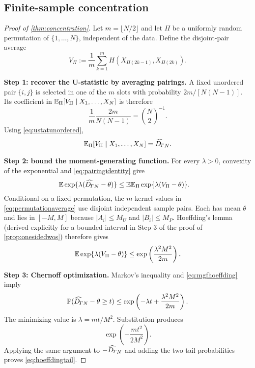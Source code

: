 \subsection{Finite-sample concentration}

\begin{proof}[Proof of \cref{thm:concentration}]
Let $m=\lfloor N/2\rfloor$ and let $\Pi$ be a uniformly random permutation of
$\{1,\ldots,N\}$, independent of the data.  Define the disjoint-pair average
\begin{equation}
 V_\Pi:=\frac1m\sum_{k=1}^m
 H(X_{\Pi(2k-1)},X_{\Pi(2k)}).
 \label{eq:permutationaverage}
\end{equation}

\textbf{Step 1: recover the U-statistic by averaging pairings.}
A fixed unordered pair $\{i,j\}$ is selected in one of the $m$ slots with
probability $2m/[N(N-1)]$.  Its coefficient in
$\mathbb{E}_\Pi[V_\Pi\mid X_1,\ldots,X_N]$ is therefore
\begin{equation}
 \frac1m\frac{2m}{N(N-1)}=\binom N2^{-1}.
\end{equation}
Using \cref{eq:ustatunordered},
\begin{equation}
 \mathbb{E}_\Pi[V_\Pi\mid X_1,\ldots,X_N]=\widehat{D_{\!T}}_N.
 \label{eq:pairingidentity}
\end{equation}

\textbf{Step 2: bound the moment-generating function.}
For every $\lambda>0$, convexity of the exponential and
\cref{eq:pairingidentity} give
\begin{align}
 \mathbb{E}\exp\{\lambda(\widehat{D_{\!T}}_N-\theta)\}
 &\le\mathbb{E}\mathbb{E}_\Pi\exp\{\lambda(V_\Pi-\theta)\}.
 \label{eq:mgfjensen}
\end{align}
Conditional on a fixed permutation, the $m$ kernel values in
\cref{eq:permutationaverage} use disjoint independent sample pairs.  Each has
mean $\theta$ and lies in $[-M,M]$ because
$|A_i|\le M_U$ and $|B_i|\le M_P$.  Hoeffding's lemma (derived explicitly for a bounded interval in Step 3 of the proof of \cref{prop:onesidedwos}) therefore gives
\begin{equation}
 \mathbb{E}\exp\{\lambda(V_\Pi-\theta)\}
 \le\exp\left(\frac{\lambda^2M^2}{2m}\right).
 \label{eq:mgfhoeffding}
\end{equation}

\textbf{Step 3: Chernoff optimization.}
Markov's inequality and \cref{eq:mgfhoeffding} imply
\begin{equation}
 \mathbb{P}(\widehat{D_{\!T}}_N-\theta\ge t)
 \le\exp\left(-\lambda t+\frac{\lambda^2M^2}{2m}\right).
\end{equation}
The minimizing value is $\lambda=mt/M^2$.  Substitution produces
\begin{equation}
 \exp\!\left(-\frac{mt^2}{2M^2}\right).
\end{equation}
Applying the same argument to
$-\widehat{D_{\!T}}_N$ and adding the two tail probabilities proves
\cref{eq:hoeffdingtail}.


\end{proof}
